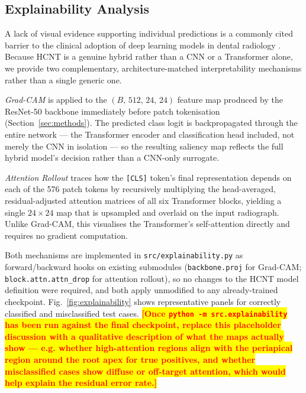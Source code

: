 \documentclass[conference]{IEEEtran}
\newcommand{\HCNT}{\textsc{HCNT}\xspace}
\newcommand{\RESULT}[1]{\colorbox{yellow}{\textcolor{red}{\textbf{#1}}}}
\begin{document}
\subsection{Explainability Analysis}
\label{sec:explainability}

A lack of visual evidence supporting individual predictions is a
commonly cited barrier to the clinical adoption of deep learning models in
dental radiology \cite{heo2021,shamshad2023}. Because \HCNT is a genuine
hybrid rather than a CNN or a Transformer alone, we provide two
complementary, architecture-matched interpretability mechanisms rather
than a single generic one.

\emph{Grad-CAM} \cite{selvaraju2017gradcam} is applied to the
$(B,\,512,\,24,\,24)$ feature map produced by the ResNet-50 backbone
immediately before patch tokenisation (Section~\ref{sec:methods}). The
predicted class logit is backpropagated through the entire network ---
the Transformer encoder and classification head included, not merely the
CNN in isolation --- so the resulting saliency map reflects the full
hybrid model's decision rather than a CNN-only surrogate.

\emph{Attention Rollout} \cite{abnar2020rollout} traces how the
\texttt{[CLS]} token's final representation depends on each of the 576
patch tokens by recursively multiplying the head-averaged,
residual-adjusted attention matrices of all six Transformer blocks,
yielding a single $24\times24$ map that is upsampled and overlaid on the
input radiograph. Unlike Grad-CAM, this visualises the Transformer's
self-attention directly and requires no gradient computation.

Both mechanisms are implemented in \texttt{src/explainability.py} as
forward/backward hooks on existing submodules (\texttt{backbone.proj} for
Grad-CAM; \texttt{block.attn.attn\_drop} for attention rollout), so no
changes to the \HCNT model definition were required, and both apply
unmodified to any already-trained checkpoint. Fig.~\ref{fig:explainability}
shows representative panels for correctly classified and misclassified
test cases. \RESULT{[Once \texttt{python -m src.explainability} has been
run against the final checkpoint, replace this placeholder discussion with
a qualitative description of what the maps actually show --- e.g. whether
high-attention regions align with the periapical region around the root
apex for true positives, and whether misclassified cases show diffuse or
off-target attention, which would help explain the residual error rate.]}
\end{document}
